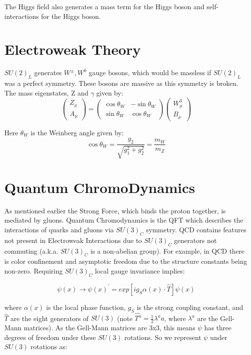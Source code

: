 The Higgs field also generates a mass term for the Higgs boson and self-interactions for the Higgs boson. 
\section{Electroweak Theory}
$SU(2)_{L}$ generates $W^{\pm}, W^{0}$ gauge bosons, which would be massless if $SU(2)_{L}$ was a perfect symmetry. These bosons are massive as this symmetry is broken. The mass eigenstates, Z and $\gamma$ given by: 
\begin{equation}
\begin{pmatrix} Z_{\mu} \\ A_{\mu} \end{pmatrix} = \begin{pmatrix} \cos \theta_{W} & -\sin \theta_{W} \\ \sin \theta_{W} & \cos \theta_{W} \end{pmatrix} \begin{pmatrix} W^{3}_{\mu} \\ B_{\mu} \end{pmatrix}
\end{equation} 

Here $\theta_{W}$ is the Weinberg angle given by: 
\begin{equation}
\cos\theta_{W}=\frac{g_{2}}{\sqrt{g_{1}^{2}+g_{2}^{2}}} = \frac{m_{W}}{m_{Z}}
\end{equation}
\section{Quantum ChromoDynamics}
As mentioned earlier the Strong Force, which binds the proton together, is mediated by gluons. Quantum Chromodynamics is the QFT which describes the interactions of quarks and gluons via $SU(3)_C$ symmetry. QCD contains features not present in Electroweak Interactions due to $SU(3)_C$ generators not commuting (a.k.a. $SU(3)_C$ is a non-abelian group). For example, in QCD there is color confinement and asymptotic freedom due to the structure constants being non-zero. Requiring $SU(3)_C$ local gauge invariance implies:

\begin{equation}
\psi(x) \rightarrow \psi(x)^{'} = exp[ig_{S}\alpha(x)\cdot\hat{T}]\psi(x)
\end{equation}

where $\alpha(x)$ is the local phase function, $g_{S}$ is the strong coupling constant, and $\hat{T}$ are the eight generators of $SU(3)$ (note $\hat{T^{a}}=\frac{1}{2}\lambda^{a} a$, where $\lambda^{a}$ are the Gell-Mann matrices). As the Gell-Mann matrices are 3x3, this means $\psi$ has three degrees of freedom under these $SU(3)$ rotations. So we represent $\psi$ under $SU(3)$ rotations as:

